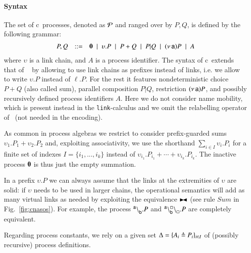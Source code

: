 \paragraph{Syntax}
The set of c\CNA\ processes, denoted as $\cal{P}$ and ranged over by $P,Q$, is defined by the following grammar:
\[
\begin{array}{rcl}
P,Q & ::= &
\mathbf{0} \;\mid\;
\upsilon.P  \;\mid\;
P+Q \;\mid\;
P|Q \;\mid\;
(\nu\, \mathsf{a}) P \;\mid\;
A
\end{array}
\]
\noindent
where $\upsilon$ is a  link chain,
and $A$ is a process identifier.
The syntax of c\CNA\  extends that of \CNA~\cite{BBB17} by allowing to use link chains as prefixes instead of links, i.e. we allow to write $\upsilon.P$ instead of $\ell.P$.
For the rest it features nondeterministic choice $P+Q$ (also called sum), parallel composition $P|Q$, restriction $(\nu\, \mathsf{a}) P$, and possibly recursively defined process identifiers $A$. 
Here we do not consider name mobility, which is present instead in the {\tt link}-calculus and we omit the relabelling operator of \CNA\ (not needed in the encoding).

As common in process algebras we restrict to consider prefix-guarded sums $\upsilon_1.P_1 + \upsilon_2.P_2$ and, exploiting associativity, we use the shorthand $\sum_{i\in I} \upsilon_i.P_i$ for a finite set of indexes $I=\{i_1,...,i_k\}$ instead of $\upsilon_{i_1}.P_{i_1} + \cdots + \upsilon_{i_k}.P_{i_k}$.
The inactive process $\mathbf{0}$ is thus just the empty summation.

In a prefix $\upsilon.P$ we can always assume that the links at the extremities of $\upsilon$ are solid: if $\upsilon$ needs to be used in larger chains, the operational semantics will add as many virtual links as needed by exploiting the equivalence $\blackstretcheq$ (see rule $\mathit{Sum}$ in Fig.~\ref{fig:cnasos}). For example, the process ${}^{\mathsf{a}} \backslash_{\mathsf{b}}^{}.P$ and ${}^{\mathsf{a}}_{}\backslash_{\mathsf{b}}^{\scriptstyle {\square}}\backslash_{\scriptstyle {\square}}^{}.P$
 are completely equivalent.
 
Regarding process constants,  we rely on a given set $\Delta=\{A_i\triangleq P_i\}_{i\in I}$ of (possibly
recursive) process definitions.


